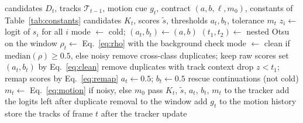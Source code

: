 \begin{algorithm}[t]
\caption{\scl{} for frame $t$; the comments name the steps of Fig.~\ref{fig:arch}. The window
holds the logits of frames $t-W$ to $t-1$, so the decision for frame $t$ uses no future frame.}\label{alg:layer}
\begin{algorithmic}[1]
\Require candidates $D_t$, tracks $\mathcal{T}_{t-1}$, motion cue $g_t$, contract $(a,b,\ell,m_0)$, constants of Table~\ref{tab:constants}
\Ensure candidates $K_t$, scores $\tilde{s}$, thresholds $a_t,b_t$, tolerance $m_t$
\State $z_i\gets$ logit of $s_i$ for all $i$ 
 
  \State mode $\gets$ cold; $(a_t,b_t)\gets(a,b)$
\Else
  \State $(t_1,t_2)\gets$ nested Otsu on the window 
  \State $\rho_t\gets$ Eq.~\eqref{eq:rho} with the background check
  \State mode $\gets$ clean if $\mathrm{median}(\rho)\ge0.5$, else noisy 
\EndIf
{} 
  \State remove cross-class duplicates; keep raw scores
   set $(a_t,b_t)$ by Eq.~\eqref{eq:clean}
  \EndIf
\Else {}
  \State remove duplicates with track context
  \State drop $z<t_1$; remap scores by Eq.~\eqref{eq:remap}
  \State $a_t\gets0.5$; $b_t\gets0.5$
\EndIf
\State rescue continuations (not cold) 
\State $m_t\gets$ Eq.~\eqref{eq:motion} if noisy, else $m_0$ 
\State pass $K_t$, $\tilde{s}$, $a_t$, $b_t$, $m_t$ to the tracker
\State add the logits left after duplicate removal to the window
\State add $g_t$ to the motion history
\State store the tracks of frame $t$ after the tracker update
\end{algorithmic}
\end{algorithm}
